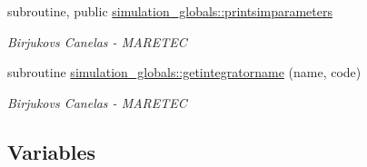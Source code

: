 \begin{DoxyCompactItemize}
subroutine, public \mbox{\hyperlink{namespacesimulation__globals_a1e5d10f7d7954c9d5346294c72a738c1}{simulation\+\_\+globals\+::printsimparameters}}
\begin{DoxyCompactList}\small\item\em Birjukovs Canelas -\/ M\+A\+R\+E\+T\+EC \end{DoxyCompactList}\item 
subroutine \mbox{\hyperlink{namespacesimulation__globals_a2c6bf88542c503d1da58280ab3dcf772}{simulation\+\_\+globals\+::getintegratorname}} (name, code)
\begin{DoxyCompactList}\small\item\em Birjukovs Canelas -\/ M\+A\+R\+E\+T\+EC \end{DoxyCompactList}\end{DoxyCompactItemize}
\subsection*{Variables}
